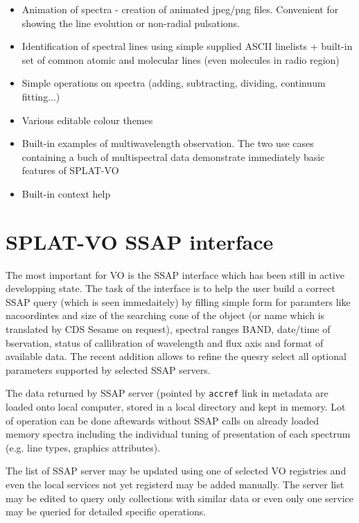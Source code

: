 \documentclass[final,authoryear,5p,times,twocolumn]{elsarticle}
\begin{document}
\begin{itemize}
\item Animation of spectra - creation of animated jpeg/png files. Convenient
for showing the line evolution or non-radial pulsations.

\item Identification of spectral lines using simple supplied ASCII linelists +
built-in set of common  atomic and molecular lines (even molecules in radio
region)

\item Simple operations on spectra (adding, subtracting, dividing, continuum fitting...)

\item Various editable colour themes

\item Built-in examples of multiwavelength observation. The two use cases
containing a buch of multispectral data demonstrate immediately basic features
of SPLAT-VO

\item Built-in context help 


\end{itemize}


\section{ SPLAT-VO SSAP interface}

The most important for VO is the SSAP interface which has been still in active
developping state.  The task of the interface is to help the user build a
correct SSAP query (which is seen immedaitely) by filling simple form for
paramters like nacoordintes and size of the searching cone of the object (or
name which is translated by CDS Sesame on request), spectral ranges BAND,
date/time of bservation, status of callibration of  wavelength and flux axis
and format of available data.  The recent addition allows to refine the quesry
select all optional parameters supported by selected SSAP servers.

The data returned by SSAP server (pointed by {\tt accref} link in metadata are
loaded onto local computer, stored in a local directory  and kept in memory.
Lot of operation can be done aftewards without SSAP calls on already loaded
memory spectra including the individual tuning of presentation of each
spectrum (e.g. line types, graphics attributes).

The list of SSAP server may be updated using one of selected VO registries and even the local
services not yet registerd may be added manually. The server list may be
edited to query only collections with similar data or even only one service
may be queried for detailed specific operations.
\end{document}
